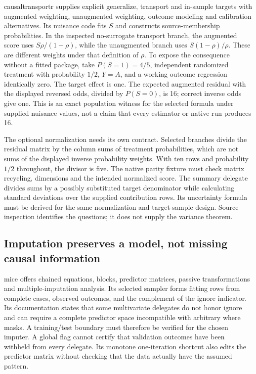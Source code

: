causaltransportr supplies explicit generalize, transport and in-sample targets with augmented weighting, unaugmented weighting, outcome modeling and calibration alternatives. Its nuisance code fits $S$ and constructs source-membership probabilities. In the inspected no-surrogate transport branch, the augmented score uses $S\rho/(1-\rho)$, while the unaugmented branch uses $S(1-\rho)/\rho$. These are different weights under that definition of $\rho$. To expose the consequence without a fitted package, take $P(S=1)=4/5$, independent randomized treatment with probability $1/2$, $Y=A$, and a working outcome regression identically zero. The target effect is one. The expected augmented residual with the displayed reversed odds, divided by $P(S=0)$, is 16; correct inverse odds give one. This is an exact population witness for the selected formula under supplied nuisance values, not a claim that every estimator or native run produces 16.~\citep{exec25_rtm_causaltransportr,exec25_rtm_choice}

The optional normalization needs its own contract. Selected branches divide the residual matrix by the column sums of treatment probabilities, which are not sums of the displayed inverse probability weights. With ten rows and probability $1/2$ throughout, the divisor is five. The native parity fixture must check matrix recycling, dimensions and the intended normalized score. The summary delegate divides sums by a possibly substituted target denominator while calculating standard deviations over the supplied contribution rows. Its uncertainty formula must be derived for the same normalization and target-sample design. Source inspection identifies the questions; it does not supply the variance theorem.~\citep{exec25_rtm_causaltransportr,exec25_rtm_choice}

\subsection{Imputation preserves a model, not missing causal information}

mice offers chained equations, blocks, predictor matrices, passive transformations and multiple-imputation analysis. Its selected sampler forms fitting rows from complete cases, observed outcomes, and the complement of the ignore indicator. Its documentation states that some multivariate delegates do not honor ignore and can require a complete predictor space incompatible with arbitrary where masks. A training/test boundary must therefore be verified for the chosen imputer. A global flag cannot certify that validation outcomes have been withheld from every delegate. Its monotone one-iteration shortcut also edits the predictor matrix without checking that the data actually have the assumed pattern.~\citep{exec25_rtm_mice}

